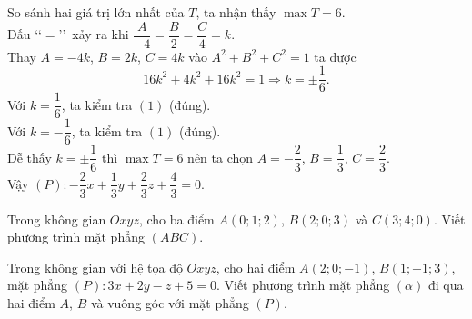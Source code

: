\begin{ex}
{		So sánh hai giá trị lớn nhất của $T$, ta nhận thấy $\max T=6$.\\
		Dấu \lq\lq$=$\rq\rq\, xảy ra khi $\dfrac{A}{-4}=\dfrac{B}{2}=\dfrac{C}{4}=k$.\\
		Thay $A=-4k$, $B=2k$, $C=4k$ vào $A^2+B^2+C^2=1$ ta được
		$$16k^2+4k^2+16k^2=1\Rightarrow k=\pm \dfrac{1}{6}.$$
		Với $k=\dfrac{1}{6}$, ta kiểm tra $(1)$ (đúng).\\
		Với $k=-\dfrac{1}{6}$, ta kiểm tra $(1)$ (đúng).\\
		Dễ thấy $k=\pm \dfrac{1}{6}$ thì $\max T=6$ nên ta chọn $A=-\dfrac{2}{3}$, $B=\dfrac{1}{3}$, $C=\dfrac{2}{3}$.\\
		Vậy $(P)\colon -\dfrac{2}{3}x+\dfrac{1}{3}y+\dfrac{2}{3}z+\dfrac{4}{3}=0$.
	}
\end{ex}

\begin{bt}%
	Trong không gian $Oxyz$, cho ba điểm $A(0;1;2)$, $B(2;0;3)$ và $C(3;4;0)$. Viết phương trình mặt phẳng $(ABC)$.
\end{bt}

\begin{bt}%
	Trong không gian với hệ tọa độ $Oxyz$, cho hai điểm $A(2;0;-1)$, $B(1;-1;3)$, mặt phẳng $(P)\colon 3x+2y-z+5=0$. Viết phương trình mặt phẳng $(\alpha)$ đi qua hai điểm $A$, $B$ và vuông góc với mặt phẳng $(P)$.
\end{bt}

